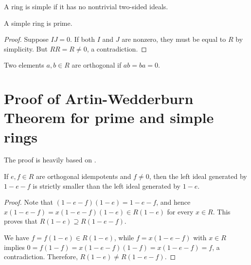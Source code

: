 \begin{definition}
  \label{def:IsSimpleRing}
  A ring is simple if it has no nontrivial two-sided ideals.
\end{definition}

\begin{theorem}
  \label{thm:simple_ring_is_prime}
  \leanok
  A simple ring is prime.
\end{theorem}
\begin{proof}
  \leanok
  Suppose $IJ = 0$. If both $I$ and $J$ are nonzero, they must be equal to $R$ by simplicity. But $RR = R \neq 0$, a contradiction.
\end{proof}

\begin{definition}
  \label{def:IsOrthogonal}
  Two elements $a, b \in R$ are orthogonal if $ab = ba = 0$.
\end{definition}

\section{Proof of Artin-Wedderburn Theorem for prime and simple rings}
The proof is heavily based on \cite{bresar2024wedderburnartintheorem}.
\begin{theorem}
  \label{thm:one_sub_e_larger_span_on_sub_e_sub_f}
  \leanok
  If $e, f \in R$ are orthogonal idempotents and $f \neq 0$, then the left ideal generated by $1 - e - f$ is strictly smaller than the left ideal generated by $1 - e$.
\end{theorem}
\begin{proof}
  \leanok
  Note that $(1 - e - f)(1 - e) = 1 - e - f$, and hence
  $x(1 - e - f) = x(1 - e - f)(1 - e) \in R(1 - e)$
  for every $x \in R$. This proves that $R(1 - e) \supseteq R(1 - e - f)$.

  We have $f = f(1 - e) \in R(1 - e)$, while $f = x(1 - e - f)$ with $x \in R$ implies
  $0 = f(1 - f) = x(1 - e - f)(1 - f) = x(1 - e - f) = f$,
  a contradiction. Therefore, $R(1 - e) \neq R(1 - e - f)$.
\end{proof}

